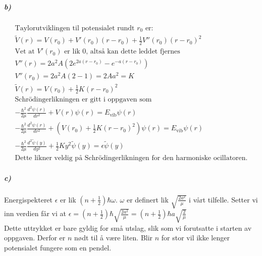 \documentclass[11pt, A4paper,norsk]{article}
\begin{document}
			\subparagraph{b)}
				\begin{gather*}
\text{Taylorutviklingen til potensialet rundt $r_0$ er:} \\
\tilde{V}(r) = V(r_0) + V'(r_0) (r - r_0) + \frac{1}{2} V''(r_0) (r - r_0)^2 \\
\text{Vet at $V'(r_0)$ er lik $0$, altså kan dette leddet fjernes} \\
V''(r) = 2 a^2 A \left( 2 e^{2 a (r - r_0)} - e^{- a (r - r_0)} \right) \\
V''(r_0) = 2 a^2 A \left( 2 - 1 \right) = 2 A a^2 = K \\
\tilde{V}(r) = V(r_0) + \frac{1}{2} K (r - r_0)^2 \\
\text{Schrödingerlikningen er gitt i oppgaven som} \\
- \frac{\hbar^2}{2 \mu} \frac{d^2 \psi(r)}{dr^2} + V(r) \psi(r) = E_{\text{vib}} \psi(r) \\
- \frac{\hbar^2}{2 \mu} \frac{d^2 \psi(r)}{dr^2} + \left( V(r_0) + \frac{1}{2} K (r - r_0)^2 \right) \psi(r) = E_{\text{vib}} \psi(r) \\
- \frac{\hbar^2}{2 \mu} \frac{d^2 \tilde{\psi}(y)}{dy^2} + \frac{1}{2} K y^2 \tilde{\psi}(y) = \epsilon \tilde{\psi}(y) \\
\text{Dette likner veldig på Schrödingerlikningen for den harmoniske ocillatoren.}
				\end{gather*}









			\subparagraph{c)}
				\begin{flushleft}
Energispekteret $\epsilon$ er lik $\left( n +  \frac{1}{2} \right) \hbar \omega$. $\omega$ er definert lik $\sqrt{\frac{2 a^2}{\mu}}$ i vårt tilfelle. Setter vi inn verdien får vi at $\epsilon = \left( n +  \frac{1}{2} \right) \hbar \sqrt{\frac{2 a^2}{\mu}} = \left( n +  \frac{1}{2} \right) \hbar a \sqrt{\frac{2}{\mu}}$ \\
Dette uttrykket er bare gyldig for små utslag, slik som vi forutsatte i starten av oppgaven. Derfor er $n$ nødt til å være liten. Blir $n$ for stor vil ikke lenger potensialet fungere som en pendel.
				\end{flushleft}
			
\end{document}
